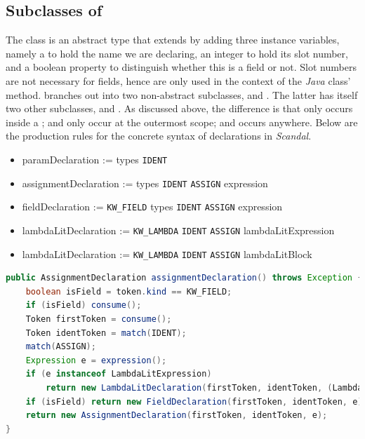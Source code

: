 \subsection{Subclasses of }

The class  is an abstract type that extends  by adding three instance variables, namely a  to hold the name we are declaring, an integer to hold its slot number, and a boolean property to distinguish whether this is a field or not. Slot numbers are not necessary for fields, hence are only used in the context of the \emph{Java} class'  method.  branches out into two non-abstract subclasses,  and . The latter has itself two other subclasses,  and . As discussed above, the difference is that  only occurs inside a ;  and  only occur at the outermost scope; and  occurs anywhere. Below are the production rules for the concrete syntax of declarations in \emph{Scandal}.

\begin{itemize}
	\item paramDeclaration := types \texttt{IDENT}
	\item assignmentDeclaration := types \texttt{IDENT} \texttt{ASSIGN} expression
	\item fieldDeclaration := \texttt{KW\_FIELD} types \texttt{IDENT} \texttt{ASSIGN} expression	
	\item lambdaLitDeclaration := \texttt{KW\_LAMBDA} \texttt{IDENT} \texttt{ASSIGN} lambdaLitExpression
	\item lambdaLitDeclaration := \texttt{KW\_LAMBDA} \texttt{IDENT} \texttt{ASSIGN} lambdaLitBlock
\end{itemize}

\begin{lstlisting}[basicstyle=\scriptsize,language=Java,caption={Parsing Top-Level Declarations.},label={alg:assign}]
public AssignmentDeclaration assignmentDeclaration() throws Exception {
	boolean isField = token.kind == KW_FIELD;
	if (isField) consume();
	Token firstToken = consume();
	Token identToken = match(IDENT);
	match(ASSIGN);
	Expression e = expression();
	if (e instanceof LambdaLitExpression)
		return new LambdaLitDeclaration(firstToken, identToken, (LambdaLitExpression) e);
	if (isField) return new FieldDeclaration(firstToken, identToken, e);
	return new AssignmentDeclaration(firstToken, identToken, e);
}
\end{lstlisting}


